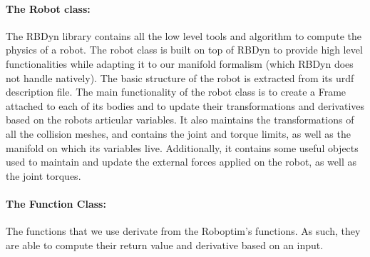 \paragraph{The Robot class:}
The RBDyn library contains all the low level tools and algorithm to compute the physics of a robot.
The robot class is built on top of RBDyn to provide high level functionalities while adapting it to our manifold formalism (which RBDyn does not handle natively).
The basic structure of the robot is extracted from its urdf description file.
The main functionality of the robot class is to create a Frame attached to each of its bodies and to update their transformations and derivatives based on the robots articular variables.
It also maintains the transformations of all the collision meshes, and contains the joint and torque limits, as well as the manifold on which its variables live.
Additionally, it contains some useful objects used to maintain and update the external forces applied on the robot, as well as the joint torques.

\paragraph{The Function Class:}
The functions that we use derivate from the Roboptim's functions.
As such, they are able to compute their return value and derivative based on an input.

